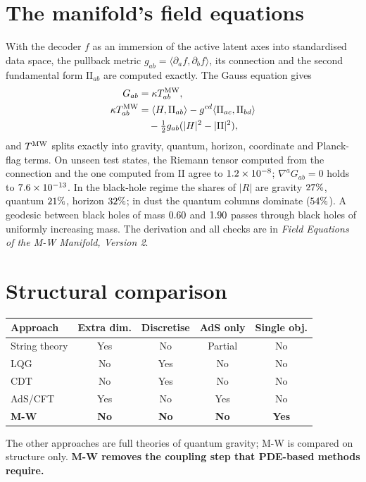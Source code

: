 \documentclass[10pt,twocolumn]{article}
\begin{document}
\section{The manifold's field equations}
With the decoder $f$ as an immersion of the \ActA{} active latent axes into standardised data space,
the pullback metric $g_{ab}=\langle\partial_af,\partial_bf\rangle$, its connection and the second
fundamental form $\mathrm{II}_{ab}$ are computed exactly. The Gauss equation gives
\begin{align*}
G_{ab}&=\kappa T^{\rm MW}_{ab},\\
\kappa T^{\rm MW}_{ab}&=\langle H,\mathrm{II}_{ab}\rangle-g^{cd}\langle\mathrm{II}_{ac},\mathrm{II}_{bd}\rangle\\
&\quad-\tfrac12g_{ab}(|H|^2-|\mathrm{II}|^2),
\end{align*}
and $T^{\rm MW}$ splits exactly into gravity, quantum, horizon, coordinate and Planck-flag terms.
On \NptsA{} unseen test states, the Riemann tensor computed from the connection and the one
computed from $\mathrm{II}$ agree to $1.2\times10^{-8}$; $\nabla^aG_{ab}=0$ holds to $7.6\times10^{-13}$. In the
black-hole regime the shares of $|R|$ are gravity $27\%$, quantum $21\%$,
horizon $32\%$; in dust the quantum columns dominate ($54\%$). A geodesic between
black holes of mass $0.60$ and $1.90$ passes through black holes of uniformly increasing
mass. The derivation and all checks are in \emph{Field Equations of the M-W Manifold, Version 2}.

\section{Structural comparison}
\begin{table}[h]\centering\footnotesize\setlength{\tabcolsep}{4pt}
\begin{tabular}{@{}lcccc@{}}\toprule
Approach & Extra dim. & Discretise & AdS only & Single obj.\\\midrule
String theory & Yes & No & Partial & No\\
LQG & No & Yes & No & No\\
CDT & No & Yes & No & No\\
AdS/CFT & Yes & No & Yes & No\\
\textbf{M-W} & \textbf{No} & \textbf{No} & \textbf{No} & \textbf{Yes}\\\bottomrule
\end{tabular}
\end{table}
The other approaches are full theories of quantum gravity; M-W is compared on structure only.
\textbf{M-W removes the coupling step that PDE-based methods require.}
\end{document}
